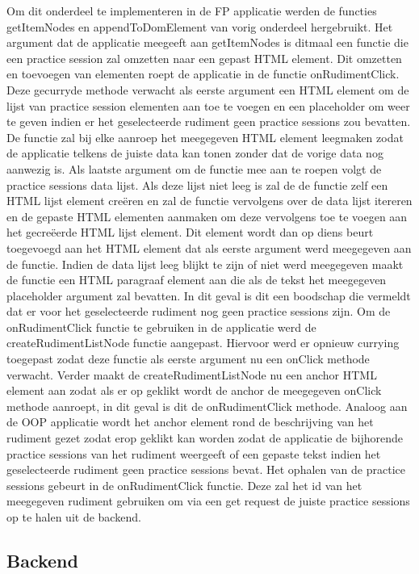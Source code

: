 Om dit onderdeel te implementeren in de FP applicatie werden de functies getItemNodes en appendToDomElement van vorig onderdeel hergebruikt. Het argument dat de applicatie meegeeft aan getItemNodes is ditmaal een functie die een practice session zal omzetten naar een gepast HTML element. Dit omzetten en toevoegen van elementen roept de applicatie in de functie onRudimentClick. Deze gecurryde methode verwacht als eerste argument een HTML element om de lijst van practice session elementen aan toe te voegen en een placeholder om weer te geven indien er het geselecteerde rudiment geen practice sessions zou bevatten. De functie zal bij elke aanroep het meegegeven HTML element leegmaken zodat de applicatie telkens de juiste data kan tonen zonder dat de vorige data nog aanwezig is. Als laatste argument om de functie mee aan te roepen volgt de practice sessions data lijst. Als deze lijst niet leeg is zal de de functie zelf een HTML lijst element creëren en zal de functie vervolgens over de data lijst itereren en de gepaste HTML elementen aanmaken om deze vervolgens toe te voegen aan het gecreëerde HTML lijst element. Dit element wordt dan op diens beurt toegevoegd aan het HTML element dat als eerste argument werd meegegeven aan de functie. Indien de data lijst leeg blijkt te zijn of niet werd meegegeven maakt de functie een HTML paragraaf element aan die als de tekst het meegegeven placeholder argument zal bevatten. In dit geval is dit een boodschap die vermeldt dat er voor het geselecteerde rudiment nog geen practice sessions zijn. Om de onRudimentClick functie te gebruiken in de applicatie werd de createRudimentListNode functie aangepast. Hiervoor werd er opnieuw currying toegepast zodat deze functie als eerste argument nu een onClick methode verwacht. Verder maakt de createRudimentListNode nu een anchor HTML element aan zodat als er op geklikt wordt de anchor de meegegeven onClick methode aanroept, in dit geval is dit de onRudimentClick methode. Analoog aan de OOP applicatie wordt het anchor element rond de beschrijving van het rudiment gezet zodat erop geklikt kan worden zodat de applicatie de bijhorende practice sessions van het rudiment weergeeft of een gepaste tekst indien het geselecteerde rudiment geen practice sessions bevat. Het ophalen van de practice sessions gebeurt in de onRudimentClick functie. Deze zal het id van het meegegeven rudiment gebruiken om via een get request de juiste practice sessions op te halen uit de backend.

\subsection{Backend}
